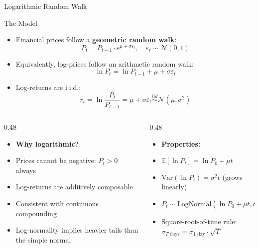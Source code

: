 \documentclass[9pt, aspectratio=169, t]{beamer}
\theoremstyle{definition}
\newenvironment{cminipage}[1]{%
    \par\noindent\hfill\begin{minipage}{#1}\ignorespaces
}{%
    \end{minipage}\hfill\null\par
}
\newcommand{\E}{\mathbb{E}}
\newcommand{\Var}{\text{Var}}
\begin{document}
\begin{frame}[shrink=5]{Logarithmic Random Walk}
\begin{cminipage}{0.95\textwidth}
\begin{block}{The Model}
\begin{itemize}\setlength{\itemsep}{0pt}
    \item Financial prices follow a \textbf{geometric random walk}:
    $$P_t = P_{t-1} \cdot e^{\mu + \sigma\varepsilon_t}, \quad \varepsilon_t \sim \mathcal{N}(0,1)$$
    \item Equivalently, log-prices follow an arithmetic random walk:
    $$\ln P_t = \ln P_{t-1} + \mu + \sigma\varepsilon_t$$
    \item Log-returns are i.i.d.:
    $$r_t = \ln\frac{P_t}{P_{t-1}} = \mu + \sigma\varepsilon_t \stackrel{iid}{\sim} \mathcal{N}(\mu, \sigma^2)$$
\end{itemize}
\end{block}

\begin{columns}[T]
\begin{column}{0.48\textwidth}
\begin{itemize}\setlength{\itemsep}{0pt}
    \item \textbf{Why logarithmic?}
    \item Prices cannot be negative: $P_t > 0$ always
    \item Log-returns are additively composable
    \item Consistent with continuous compounding
    \item Log-normality implies heavier tails than the simple normal
\end{itemize}
\end{column}
\begin{column}{0.48\textwidth}
\begin{itemize}\setlength{\itemsep}{0pt}
    \item \textbf{Properties:}
    \item $\E[\ln P_t] = \ln P_0 + \mu t$
    \item $\Var(\ln P_t) = \sigma^2 t$ (grows linearly)
    \item $P_t \sim \text{LogNormal}(\ln P_0 + \mu t, \sigma^2 t)$
    \item Square-root-of-time rule: $\sigma_{T\text{ days}} = \sigma_{1\text{ day}} \cdot \sqrt{T}$
\end{itemize}
\end{column}
\end{columns}
\end{cminipage}
\end{frame}
\end{document}
